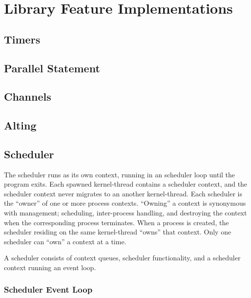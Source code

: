 \section{Library Feature Implementations}

\subsection{Timers}

\subsection{Parallel Statement}

\subsection{Channels}

\subsection{Alting}


\FloatBarrier
\subsection{Scheduler}
\label{subsec:scheduler}

The scheduler runs as its own context, running in an scheduler loop until the program exits. Each spawned kernel\hyp{}thread contains a scheduler context, and the scheduler context never migrates to an another kernel\hyp{}thread. Each scheduler is the ``owner'' of one or more process contexts. ``Owning'' a context is synonymous with management; scheduling, inter\hyp{}process handling, and destroying the context when the corresponding process terminates. When a process is created, the scheduler residing on the same kernel\hyp{}thread ``owns'' that context. Only one scheduler can ``own'' a context at a time.

A scheduler consists of context queues, scheduler functionality, and a scheduler context running an event loop.


\FloatBarrier
\subsubsection{Scheduler Event Loop}

